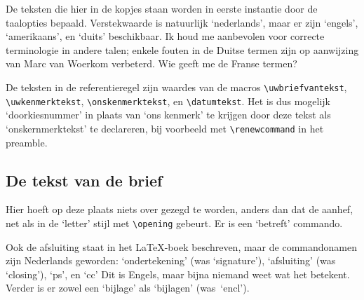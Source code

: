 De teksten die hier in de kopjes staan worden                                   
in eerste instantie door de taalopties bepaald.                                 
Verstekwaarde is natuurlijk `nederlands', maar er                               
zijn `engels', `amerikaans', en `duits' beschikbaar.                            
Ik houd me aanbevolen voor correcte terminologie                                
in andere talen; enkele fouten in de Duitse termen                              
zijn op aanwijzing van Marc van Woerkom verbeterd.                              
Wie geeft me de Franse termen?                                                  
                                                                                
De teksten in de referentieregel                                                
zijn waardes van de macros                                                      
\verb.\uwbriefvantekst., \verb.\uwkenmerktekst.,                                
\verb.\onskenmerktekst., en \verb.\datumtekst..                                 
Het is dus mogelijk  `doorkiesnummer' in plaats van `ons kenmerk'               
te krijgen door deze tekst                                                      
als `onskernmerktekst' te declareren, bij voorbeeld                             
met \verb.\renewcommand. in het preamble.                                       
                                                                                
                                                                                
\subsection{De tekst van de brief}                                              
                                                                                
Hier hoeft op deze plaats niets over gezegd te worden,                          
anders dan dat de aanhef, net als in de `letter' stijl                          
met \verb.\opening. gebeurt. Er is een `betreft' commando.                      
                                                                                
Ook de afsluiting staat in het \LaTeX-boek beschreven,                          
maar de commandonamen zijn Nederlands geworden:                                 
`ondertekening' (was `signature'),                                              
`afsluiting' (was `closing'), `ps', en `cc' Dit is Engels,                      
maar bijna niemand weet wat het betekent.                                       
Verder is er zowel een `bijlage' als                                            
`bijlagen' (was~`encl').                                                        
                                                                                

